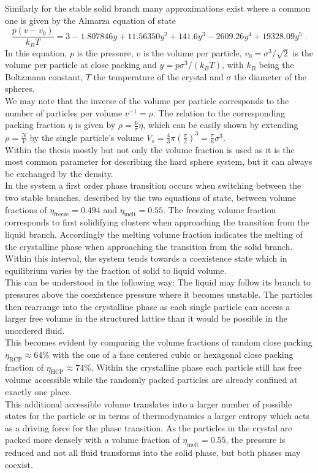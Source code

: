 Similarly for the stable solid branch many approximations exist where a common one is given by the Almarza equation of state\cite{Almarza2009}
\begin{equation}
\frac{p(v-v_0)}{k_B T} = 3 - 1.807846 y + 11.56350 y^2 + 141.6 y^3 - 2609.26 y^4 + 19328.09 y^5 \; \text{.}
\end{equation}
In this equation, $p$ is the pressure, $v$ is the volume per particle, $v_0=\sigma^3/\sqrt{2}$ is the volume per particle at close packing and $y=p \sigma^3 / (k_B T)$, with $k_B$ being the Boltzmann constant, $T$ the temperature of the crystal and $\sigma$ the diameter of the spheres.\\
We may note that the inverse of the volume per particle corresponds to the number of particles per volume $ v^{-1} = \rho$. The relation to the corresponding packing fraction $\eta$ is given by $\rho = \frac{6}{ \pi} \eta$, which can be easily shown by extending $\rho = \frac{N}{V}$ by the single particle's volume $V_s = \frac{4}{3} \pi \left(\frac{\sigma}{2}\right)^3 = \frac{\pi}{6} \sigma^3$.\\
Within the thesis mostly but not only the volume fraction is used as it is the most common parameter for describing the hard sphere system, but it can always be exchanged by the density.\\ 

In the system a first order phase transition occurs when switching between the two stable branches, described by the two equations of state, between volume fractions of $\eta_{\text{freeze}} = 0.494$ and $\eta_{\text{melt}}=0.55$. The freezing volume fraction corresponds to first solidifying clusters when approaching the transition from the liquid branch. Accordingly the melting volume fraction indicates the melting of the crystalline phase when approaching the transition from the solid branch. Within this interval, the system tends towards a coexistence state which in equilibrium varies by the fraction of solid to liquid volume.\\
This can be understood in the following way: The liquid may follow its branch to pressures above the coexistence pressure where it becomes unstable. The particles then rearrange into the crystalline phase as each single particle can access a larger free volume in the structured lattice than it would be possible in the unordered fluid.\\
This becomes evident by comparing the volume fractions of random close packing $\eta_{\text{RCP}}\approx 64\%$ with the one of a face centered cubic or hexagonal close packing fraction of $\eta_{\text{HCP}} \approx 74 \%$. Within the crystalline phase each particle still has free volume accessible while the randomly packed particles are already confined at exactly one place.\\
This additional accessible volume translates into a larger number of possible states for the particle or in terms of thermodynamics a larger entropy which acts as a driving force for the phase transition. As the particles in the crystal are packed more densely with a volume fraction of $\eta_{\text{melt}}=0.55$, the pressure is reduced and not all fluid transforms into the solid phase, but both phases may coexist.\\

